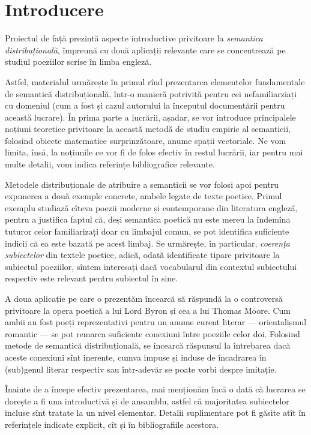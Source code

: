 \chapter*{Introducere}

\indent\indent Proiectul de față prezintă aspecte introductive privitoare la \emph{semantica %
  distribuțională}, îm\-pre\-u\-nă cu două aplicații relevante care se concentrează
pe studiul poeziilor scrise în limba engleză.

Astfel, materialul urmărește în primul rînd prezentarea elementelor fundamentale
de semantică distribuțională, într-o manieră potrivită pentru cei
nefamiliarziați cu domeniul (cum a fost și cazul autorului la începutul
documentării pentru această lucrare). În prima parte a lucrării, așadar, se
vor introduce principalele noțiuni teoretice privitoare la această metodă de
studiu empiric al semanticii, folosind obiecte matematice surprinzătoare,
anume spații vectoriale. Ne vom limita, însă, la noțiunile ce vor fi de
folos efectiv în restul lucrării, iar pentru mai multe detalii, vom indica
referințe bibliografice relevante.

Metodele distribuționale de atribuire a semanticii se vor folosi apoi pentru
expunerea a două exemple concrete, ambele legate de texte poetice. Primul
exemplu studiază cîteva poezii moderne și contemporane din literatura engleză,
pentru a justifica faptul că, deși semantica poetică nu este mereu la îndemîna
tuturor celor familiarizați doar cu limbajul comun, se pot identifica suficiente
indicii că ea este bazată pe acest limbaj. Se urmărește, în particular,
\emph{coerența subiectelor} din textele poetice, adică, odată identificate
tipare privitoare la subiectul poeziilor, sîntem interesați dacă vocabularul
din contextul subiectului respectiv este relevant pentru subiectul în sine.

A doua aplicație pe care o prezentăm încearcă să răspundă la o controversă
privitoare la opera poetică a lui Lord Byron și cea a lui Thomas Moore. Cum
ambii au fost poeți reprezentativi pentru un anume curent literar ---
orientalismul romantic --- se pot remarca suficiente conexiuni între poeziile
celor doi. Folosind metode de semantică distribuțională, se încearcă răspunsul
la întrebarea dacă aceste conexiuni sînt inerente, cumva impuse și induse de
încadrarea în (sub)genul literar respectiv sau într-adevăr se poate vorbi despre
imitație.

\vspace{0.3cm}

Înainte de a începe efectiv prezentarea, mai menționăm încă o dată că lucrarea
se dorește a fi una introductivă și de ansamblu, astfel că majoritatea
subiectelor incluse sînt tratate la un nivel elementar. Detalii suplimentare
pot fi găsite atît în referințele indicate explicit, cît și în bibliografiile
acestora.


